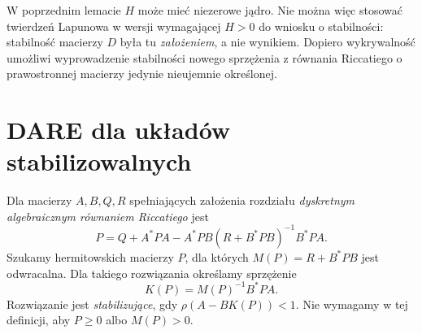 \begin{uwaga}
\label{rem:lin26-feedback-semi}
W poprzednim lemacie
\(H\) może mieć niezerowe
jądro. Nie można więc
stosować twierdzeń Lapunowa
w wersji wymagającej \(H>0\)
do wniosku o stabilności:
stabilność macierzy \(D\)
była tu \emph{założeniem},
a nie wynikiem.
Dopiero wykrywalność
umożliwi wyprowadzenie
stabilności nowego sprzężenia
z równania Riccatiego
o prawostronnej macierzy
jedynie nieujemnie określonej.
\end{uwaga}

\section{DARE dla układów stabilizowalnych}
\label{sec:lin26-dare}

\begin{definicja}
\label{def:lin26-dare}
Dla macierzy \(A,B,Q,R\)
spełniających założenia rozdziału
\emph{dyskretnym algebraicznym
równaniem Riccatiego} jest
\[
 P=Q+A^*PA
   -A^*PB(R+B^*PB)^{-1}B^*PA.
\]
Szukamy hermitowskich macierzy
\(P\), dla których
\(M(P)=R+B^*PB\) jest odwracalna.
Dla takiego rozwiązania
określamy sprzężenie
\[
 K(P)=M(P)^{-1}B^*PA.
\]
Rozwiązanie jest
\emph{stabilizujące}, gdy
\(\rho(A-BK(P))<1\).
Nie wymagamy w tej definicji,
aby \(P\ge0\) albo \(M(P)>0\).
\end{definicja}

